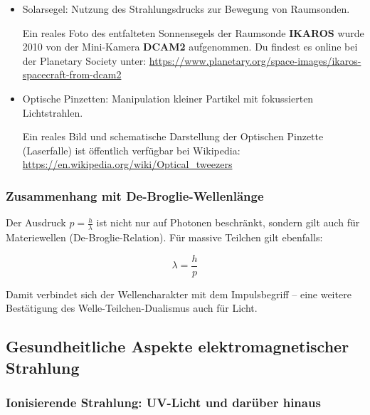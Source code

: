 \begin{itemize}
	\item Solarsegel: Nutzung des Strahlungsdrucks zur Bewegung von Raumsonden.
	\begin{tcolorbox}[hinweisbox, title=Reales Bildmaterial]
		\label{keybox:RealesBildmaterial}
		Ein reales Foto des entfalteten Sonnensegels der Raumsonde \textbf{IKAROS} wurde 2010 von der Mini-Kamera \textbf{DCAM2} aufgenommen.  
		Du findest es online bei der Planetary Society unter:  
		\url{https://www.planetary.org/space-images/ikaros-spacecraft-from-dcam2}
	\end{tcolorbox}
	\item Optische Pinzetten: Manipulation kleiner Partikel mit fokussierten Lichtstrahlen.
	\begin{tcolorbox}[hinweisbox, title=Reales Bildmaterial zur optischen Pinzette]
		\label{box:Manipulation kleiner Partikel}
		Ein reales Bild und schematische Darstellung der Optischen Pinzette (Laserfalle) ist öffentlich verfügbar bei Wikipedia:  
		\url{https://en.wikipedia.org/wiki/Optical_tweezers}
	\end{tcolorbox}
\end{itemize}

\subsubsection{Zusammenhang mit De-Broglie-Wellenlänge}

Der Ausdruck \( p = \frac{h}{\lambda} \) ist nicht nur auf Photonen beschränkt, sondern gilt auch für Materiewellen (De-Broglie-Relation). Für massive Teilchen gilt ebenfalls:

\[
\lambda = \frac{h}{p}
\]

Damit verbindet sich der Wellencharakter mit dem Impulsbegriff – eine weitere Bestätigung des Welle-Teilchen-Dualismus auch für Licht.

\subsection{Gesundheitliche Aspekte elektromagnetischer \newline Strahlung}

\subsubsection{Ionisierende Strahlung: UV-Licht und darüber hinaus}

